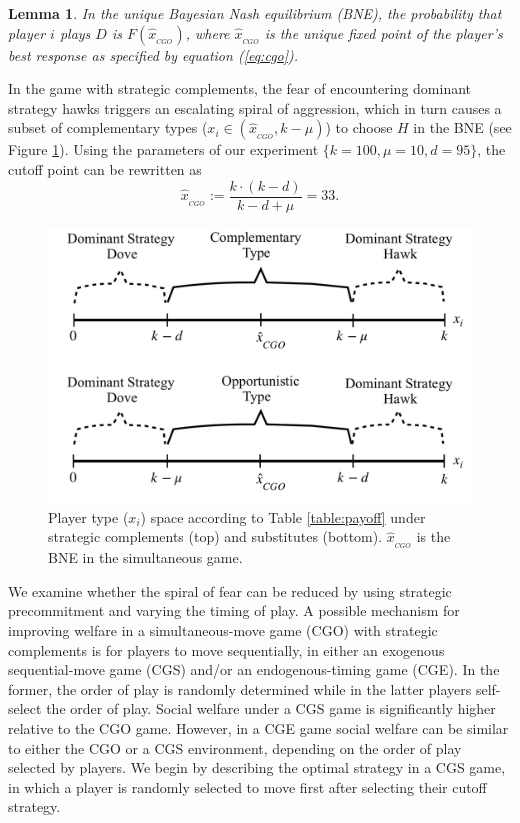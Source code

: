 \documentclass[12pt, letterpaper]{article}
\theoremstyle{plain}
\begin{document}
\newtheorem{lem}{Lemma}
\begin{lem}
In the unique Bayesian Nash equilibrium (BNE), the probability that player $i$ plays $D$ is $F(\hat{x}_{_{CGO}})$, where $\hat{x}_{_{CGO}}$ is the unique fixed point of the player's best response as specified by equation (\ref{eq:cgo}).
\end{lem}\par

In the game with strategic complements, the fear of encountering dominant strategy hawks triggers an escalating spiral of aggression, which in turn causes a subset of complementary types ($x_i \in (\hat{x}_{_{CGO}}, k-\mu)$) to choose $H$ in the BNE (see Figure \ref{fig:typespace}). Using the parameters of our experiment $\{k=100, \mu=10, d=95 \}$, the cutoff point can be rewritten as 
\begin{equation}
\hat{x}_{_{CGO}}:= \frac{k\cdot (k-d)}{k-d+\mu}=33. \label{eq:cgosol}
\end{equation}


\begin{center}
\begin{figure}[ht]
\centering{}%
\includegraphics[scale=0.21]{typespace.jpg}%
\caption{Player type ($x_i$) space according to Table \ref{table:payoff} under strategic complements (top) and substitutes (bottom). $\hat{x}_{_{CGO}}$ is the BNE in the simultaneous game.} 
\label{fig:typespace}
\end{figure}
\end{center}

We examine whether the spiral of fear can be reduced by using strategic precommitment and varying the timing of play. A possible mechanism for improving welfare in a simultaneous-move game (CGO) with strategic complements is for players to move sequentially, in either an exogenous sequential-move game (CGS) and/or an endogenous-timing game (CGE). In the former, the order of play is randomly determined while in the latter players self-select the order of play. Social welfare under a CGS game is significantly higher relative to the CGO game. However, in a CGE game social welfare can be similar to either the CGO or a CGS environment, depending on the order of play selected by players. We begin by describing the optimal strategy in a CGS game, in which a player is randomly selected to move first after selecting their cutoff strategy. 
\end{document}
